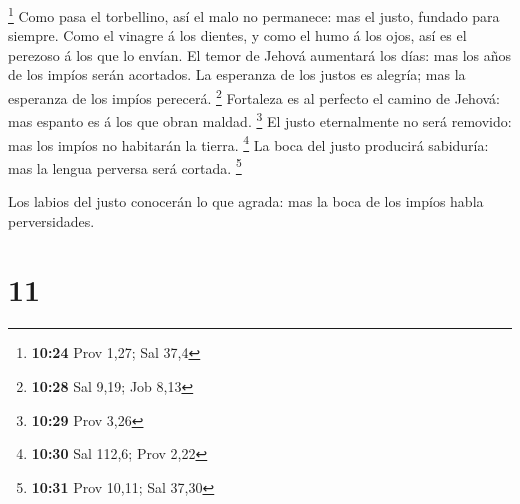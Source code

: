 \footnote{\textbf{10:24} Prov 1,27; Sal 37,4}  Como pasa el
torbellino, así el malo no permanece: mas el justo, fundado para
siempre.  Como el vinagre á los dientes, y como el humo á
los ojos, así es el perezoso á los que lo envían.  El temor
de Jehová aumentará los días: mas los años de los impíos serán
acortados.  La esperanza de los justos es alegría; mas la
esperanza de los impíos perecerá. \footnote{\textbf{10:28} Sal 9,19; Job
  8,13}  Fortaleza es al perfecto el camino de Jehová: mas
espanto es á los que obran maldad. \footnote{\textbf{10:29} Prov 3,26}
 El justo eternalmente no será removido: mas los impíos no
habitarán la tierra. \footnote{\textbf{10:30} Sal 112,6; Prov 2,22}
 La boca del justo producirá sabiduría: mas la lengua
perversa será cortada. \footnote{\textbf{10:31} Prov 10,11; Sal 37,30}

 Los labios del justo conocerán lo que agrada: mas la boca
de los impíos habla perversidades.

\hypertarget{section-10}{%
\section{11}\label{section-10}}

